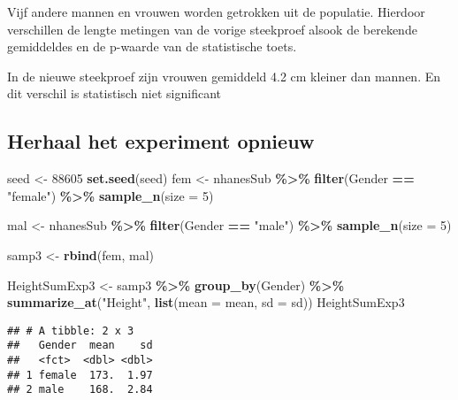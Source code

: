 \documentclass[
  12pt,dutch,coursenotes]{book}
\newenvironment{Shaded}{\begin{snugshade}}{\end{snugshade}}
\newcommand{\DataTypeTok}[1]{\textcolor[rgb]{0.13,0.29,0.53}{#1}}
\newcommand{\DecValTok}[1]{\textcolor[rgb]{0.00,0.00,0.81}{#1}}
\newcommand{\KeywordTok}[1]{\textcolor[rgb]{0.13,0.29,0.53}{\textbf{#1}}}
\newcommand{\NormalTok}[1]{#1}
\newcommand{\OperatorTok}[1]{\textcolor[rgb]{0.81,0.36,0.00}{\textbf{#1}}}
\newcommand{\StringTok}[1]{\textcolor[rgb]{0.31,0.60,0.02}{#1}}
\theoremstyle{definition}
\theoremstyle{definition}
\theoremstyle{definition}
\theoremstyle{remark}
\begin{document}
Vijf andere mannen en vrouwen worden getrokken uit de populatie. Hierdoor verschillen de lengte metingen van de vorige steekproef alsook de berekende gemiddeldes en de p-waarde van de statistische toets.

In de nieuwe steekproef zijn vrouwen gemiddeld 4.2 cm kleiner dan mannen. En dit verschil is statistisch niet significant

\hypertarget{herhaal-het-experiment-opnieuw}{%
\subsection{Herhaal het experiment opnieuw}\label{herhaal-het-experiment-opnieuw}}

\begin{Shaded}
\begin{Highlighting}[]
\NormalTok{seed \textless{}{-}}\StringTok{ }\DecValTok{88605}
\KeywordTok{set.seed}\NormalTok{(seed)}
\NormalTok{fem \textless{}{-}}\StringTok{ }\NormalTok{nhanesSub }\OperatorTok{\%\textgreater{}\%}\StringTok{ }\KeywordTok{filter}\NormalTok{(Gender }\OperatorTok{==}\StringTok{ "female"}\NormalTok{) }\OperatorTok{\%\textgreater{}\%}\StringTok{ }
\StringTok{    }\KeywordTok{sample\_n}\NormalTok{(}\DataTypeTok{size =} \DecValTok{5}\NormalTok{)}

\NormalTok{mal \textless{}{-}}\StringTok{ }\NormalTok{nhanesSub }\OperatorTok{\%\textgreater{}\%}\StringTok{ }\KeywordTok{filter}\NormalTok{(Gender }\OperatorTok{==}\StringTok{ "male"}\NormalTok{) }\OperatorTok{\%\textgreater{}\%}\StringTok{ }\KeywordTok{sample\_n}\NormalTok{(}\DataTypeTok{size =} \DecValTok{5}\NormalTok{)}

\NormalTok{samp3 \textless{}{-}}\StringTok{ }\KeywordTok{rbind}\NormalTok{(fem, mal)}

\NormalTok{HeightSumExp3 \textless{}{-}}\StringTok{ }\NormalTok{samp3 }\OperatorTok{\%\textgreater{}\%}\StringTok{ }\KeywordTok{group\_by}\NormalTok{(Gender) }\OperatorTok{\%\textgreater{}\%}\StringTok{ }\KeywordTok{summarize\_at}\NormalTok{(}\StringTok{"Height"}\NormalTok{, }
    \KeywordTok{list}\NormalTok{(}\DataTypeTok{mean =}\NormalTok{ mean, }\DataTypeTok{sd =}\NormalTok{ sd))}
\NormalTok{HeightSumExp3}
\end{Highlighting}
\end{Shaded}

\begin{verbatim}
## # A tibble: 2 x 3
##   Gender  mean    sd
##   <fct>  <dbl> <dbl>
## 1 female  173.  1.97
## 2 male    168.  2.84
\end{verbatim}
\end{document}
